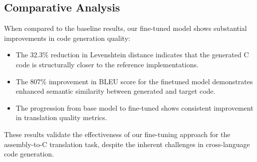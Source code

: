 \documentclass[../main.tex]{subfiles}
\begin{document}
\subsection{Comparative Analysis}

When compared to the baseline results, our fine-tuned model shows substantial improvements in code generation quality:

\begin{itemize}
\item The 32.3\% reduction in Levenshtein distance indicates that the generated C code is structurally closer to the reference implementations.
\item The 807\% improvement in BLEU score for the finetuned model demonstrates enhanced semantic similarity between generated and target code.
\item The progression from base model to fine-tuned shows consistent improvement in translation quality metrics.
\end{itemize}

These results validate the effectiveness of our fine-tuning approach for the assembly-to-C translation task, despite the inherent challenges in cross-language code generation.
\end{document}
